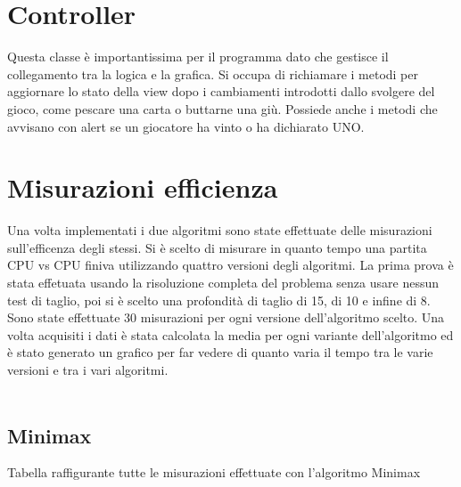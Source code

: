 \section{Controller}
	Questa classe è importantissima per il programma dato che gestisce il collegamento tra la logica e la grafica. Si occupa di richiamare i metodi per aggiornare lo stato della view dopo i cambiamenti introdotti dallo svolgere del gioco, come pescare una carta o buttarne una giù. Possiede anche i metodi che avvisano con alert se un giocatore ha vinto o ha dichiarato UNO.
	
\section{Misurazioni efficienza}
	Una volta implementati i due algoritmi sono state effettuate delle misurazioni sull'efficenza degli stessi. Si è scelto di misurare in quanto tempo una partita CPU vs CPU finiva utilizzando quattro versioni degli algoritmi. La prima prova è stata effetuata usando la risoluzione completa del problema senza usare nessun test di taglio, poi si è scelto una profondità di taglio di 15, di 10 e infine di 8. Sono state effettuate 30 misurazioni per ogni versione dell'algoritmo scelto. Una volta acquisiti i dati è stata calcolata la media per ogni variante dell'algoritmo ed è stato generato un grafico per far vedere di quanto varia il tempo tra le varie versioni e tra i vari algoritmi.\\\\
	
	\subsection{Minimax}
	Tabella raffigurante tutte le misurazioni effettuate con l'algoritmo Minimax
	
